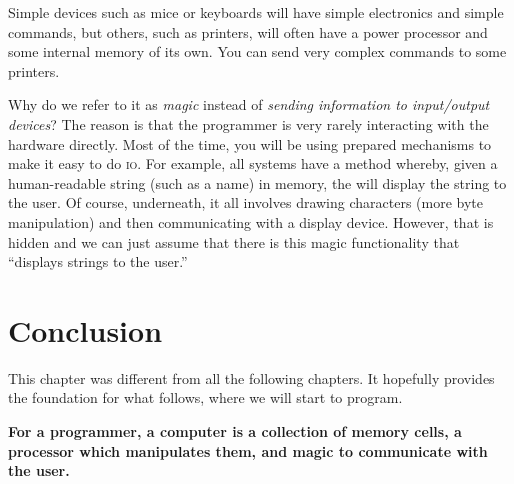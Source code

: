 Simple devices such as mice or keyboards will have simple electronics and
simple commands, but others, such as printers, will often have a power
processor and some internal memory of its own. You can send very complex
commands to some printers.

Why do we refer to it as \emph{magic} instead of \emph{sending information to
input/output devices}? The reason is that the programmer is very rarely
interacting with the hardware directly. Most of the time, you will be using
prepared mechanisms to make it easy to do \textsc{io}. For example, all systems
have a method whereby, given a human-readable string (such as a name) in
memory, the will display the string to the user. Of course, underneath, it all
involves drawing characters (more byte manipulation) and then communicating
with a display device. However, that is hidden and we can just assume that
there is this magic functionality that ``displays strings to the user.''

\section{Conclusion}

This chapter was different from all the following chapters. It hopefully
provides the foundation for what follows, where we will start to program.

\textbf{For a programmer, a computer is a collection of memory cells, a
processor which manipulates them, and magic to communicate with the user.}

